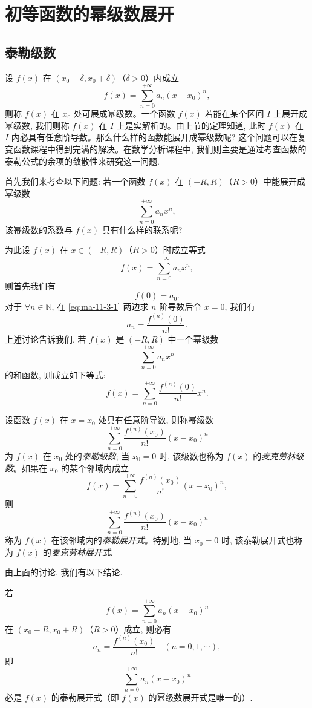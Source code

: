 \section{初等函数的幂级数展开}
\label{sec:ma-11-3}

\subsection{泰勒级数}
\label{subsec:ma-11-3-1}

设 $f(x)$ 在 $(x_0-\delta,x_0+\delta)$（$\delta>0$）内成立
\[
  f(x)=\sum_{n=0}^{+\infty}a_n(x-x_0)^n,
\]
则称 $f(x)$ 在 $x_0$ 处可展成幂级数。一个函数 $f(x)$ 若能在某个区间 $I$ 上展开成幂级数, 我们则称 $f(x)$ 在 $I$ 上是实解析的。由上节的定理知道, 此时 $f(x)$ 在 $I$ 内必具有任意阶导数。那么什么样的函数能展开成幂级数呢? 这个问题可以在复变函数课程中得到完满的解决。在数学分析课程中, 我们则主要是通过考查函数的泰勒公式的余项的敛散性来研究这一问题.

首先我们来考查以下问题: 若一个函数 $f(x)$ 在 $(-R,R)$（$R>0$）中能展开成幂级数
\[
  \sum_{n=0}^{+\infty}a_nx^n,
\]
该幂级数的系数与 $f(x)$ 具有什么样的联系呢?

为此设 $f(x)$ 在 $x\in(-R,R)$（$R>0$）时成立等式
\begin{equation}
  f(x)=\sum_{n=0}^{+\infty}a_nx^n,
  \label{eq:ma-11-3-1}
\end{equation}
则首先我们有
\[
  f(0)=a_0.
\]
对于 $\forall n\in\mathbb N$, 在 \eqref{eq:ma-11-3-1} 两边求 $n$ 阶导数后令 $x=0$, 我们有
\[
  a_n=\frac{f^{(n)}(0)}{n!}.
\]
上述讨论告诉我们, 若 $f(x)$ 是 $(-R,R)$ 中一个幂级数
\[
  \sum_{n=0}^{+\infty}a_nx^n
\]
的和函数, 则成立如下等式:
\[
  f(x)=\sum_{n=0}^{+\infty}\frac{f^{(n)}(0)}{n!}x^n.
\]

\begin{definition}\label{definition:ma-11-3-1}
设函数 $f(x)$ 在 $x=x_0$ 处具有任意阶导数, 则称幂级数
\[
  \sum_{n=0}^{+\infty}\frac{f^{(n)}(x_0)}{n!}(x-x_0)^n
\]
为 $f(x)$ 在 $x_0$ 处的\emph{泰勒级数}; 当 $x_0=0$ 时, 该级数也称为 $f(x)$ 的\emph{麦克劳林级数}。如果在 $x_0$ 的某个邻域内成立
\[
  f(x)=\sum_{n=0}^{+\infty}\frac{f^{(n)}(x_0)}{n!}(x-x_0)^n,
\]
则
\[
  \sum_{n=0}^{+\infty}\frac{f^{(n)}(x_0)}{n!}(x-x_0)^n
\]
称为 $f(x)$ 在该邻域内的\emph{泰勒展开式}。特别地, 当 $x_0=0$ 时, 该泰勒展开式也称为 $f(x)$ 的\emph{麦克劳林展开式}.
\end{definition}

由上面的讨论, 我们有以下结论.

\begin{theorem}\label{theorem:ma-11-3-1}
若
\[
  f(x)=\sum_{n=0}^{+\infty}a_n(x-x_0)^n
\]
在 $(x_0-R,x_0+R)$（$R>0$）成立, 则必有
\[
  a_n=\frac{f^{(n)}(x_0)}{n!}\quad(n=0,1,\cdots),
\]
即
\[
  \sum_{n=0}^{+\infty}a_n(x-x_0)^n
\]
必是 $f(x)$ 的泰勒展开式（即 $f(x)$ 的幂级数展开式是唯一的）.
\end{theorem}

